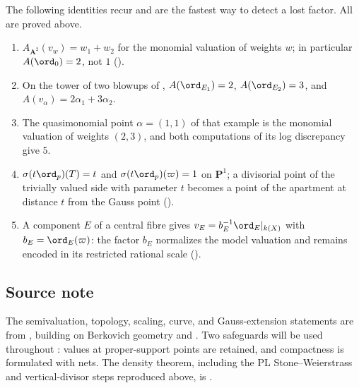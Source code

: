The following identities recur and are the fastest way to detect a lost
factor.  All are proved above.
\begin{enumerate}
\item $A_{\mathbf A^2}(v_w)=w_1+w_2$ for the monomial valuation of weights
$w$; in particular $A(\ord_0)=2$, not $1$
().
\item On the tower of two blowups of ,
$A(\ord_{E_1})=2$, $A(\ord_{E_2})=3$, and
$A(v_\alpha)=2\alpha_1+3\alpha_2$.
\item The quasimonomial point $\alpha=(1,1)$ of that example is the
monomial valuation of weights $(2,3)$, and both computations of its log
discrepancy give $5$.
\item $\sigma(t\ord_p)(T)=t$ and $\sigma(t\ord_p)(\varpi)=1$ on
$\mathbf P^1$; a divisorial point of the trivially valued side with
parameter $t$ becomes a point of the apartment at distance $t$ from the
Gauss point ().
\item A component $E$ of a central fibre gives $v_E=b_E^{-1}\ord_E|_{k(X)}$
with $b_E=\ord_E(\varpi)$: the factor $b_E$ normalizes the model valuation and remains encoded in
its restricted rational scale ().
\end{enumerate}

\subsection{Source note}
\label{sec:ch32-source-note}

The semivaluation, topology, scaling, curve, and Gauss-extension statements
are from \cite[\S1]{BJ22}, building on Berkovich geometry and
\cite{BHJ17}.  Two safeguards will be used throughout
: values at
proper-support points are retained, and compactness is formulated with nets.
The density theorem, including the PL Stone--Weierstrass and vertical-divisor
steps reproduced above, is \cite[Theorems~2.2, 2.7, and~2.14 and
Lemma~2.8]{BJ22}.

